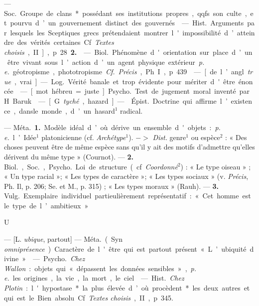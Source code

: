 \begin{itemize}[leftmargin=1cm, label=, itemsep=1pt]
 — \si{Soc.} Groupe de clans* possédant ses institutions propres,
qqfs. son culte, et pourvu d’un gouvernement distinct des gouvernés.

 — \si{Hist.} Arguments par lesquels les Sceptiques grecs
prétendaient montrer l'impossibilité d’atteindre des vérités certaines. Cf.
{\it Textes choisis}, II], p. 28 {\bf 2.}

 — \si{Biol.} Phénomène d'orientation sur place d’un être vivant
sous l’action d’un agent physique extérieur {\it p. e.} géotropisme,
phototropisme. {\it Cf.} {\it Précis}, Ph. I, p. 439.

 — [de l’angl. {\it true}, vrai] — \si{Log.} Vérité banale et
trop évidente pour mériter d'être énoncée.

 — [mot hébreu = juste] \si{Psycho.} Test de jugement moral
inventé par H. Baruk.

 — [G. {\it tyché}, hazard] —  \si{Épist.}
Doctrine qui affirme l’existence, dansle monde, d’un hasard$^1$ radical.

 — \si{Méta.} {\bf 1.} Modèle idéal d’où dérive un ensemble
d'objets : {\it p. e.} l’Idée$^1$ platonicienne (cf. {\it Archétype}$^1$).
$->$ {\it Dist.} genre$^1$ ou espèce$^2$ : « Des choses peuvent être de même
espèce sans qu'il y ait des motifs d'admettre qu'elles dérivent du même type
» (Cournot). — {\bf 2.} \si{Biol.}, \si{Soc.}, \si{Psycho.} Loi de structure
(cf. {\it Coordonné}$^2$) : « Le type oiseau » ; « Un type racial »; « Les
types de caractère »; « Les types sociaux » (v. {\it Précis}, Ph. Il, p. 206;
Se. et M., p. 315) ; « Les types moraux » (Rauh). —  {\bf 3.} \si{Vulg.}
Exemplaire individuel partieulièrement représentatif : « Cet homme est le
type de l’ambitieux. »

\begin{center}
\huge{U}
\end{center}

 — [L. {\it ubique}, partout] — \si{Méta.} (Syn. {\it
omniprésence}). Caractère de l'être qui est partout présent « L’ubiquité
divine. »

 — \si{Psycho.} {\it Chez Wallon} : objets qui « dépassent
les données sensibles », {\it p. e.} les origines, la vie, la mort, le ciel.

 — \si{Hist.} {\it Chez Plotin} : l'hypostase* la plus élevée
d’où procèdent* les deux autres et qui est le Bien absolu. Cf. {\it Textes
choisis}, II, p. 345.


\end{itemize}
